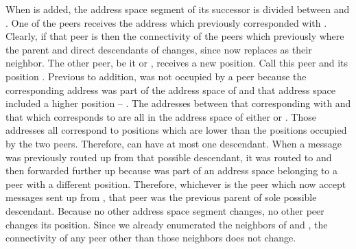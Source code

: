 \documentclass[12pt,english,journal]{elsarticle}
\makeatletter
\numberwithin{equation}{section}
\numberwithin{figure}{section}
\theoremstyle{plain}
\theoremstyle{plain}
\newenvironment{proof}[1][\protect\proofname]{\par
\normalfont\topsep6\p@\@plus6\p@\relax
\trivlist
\itemindent\parindent
\item[\hskip\labelsep
\scshape
#1]\ignorespaces
}{\endtrivlist\@endpefalse
}
\providecommand{\proofname}{Proof}
\makeatother
\begin{document}
\begin{proof}
When  is added, the address space segment of its successor
 is divided between  and . One of the
peers receives the address which previously corresponded with .
Clearly, if that peer is  then the connectivity of the peers
which previously where the parent and direct descendants of 
changes, since  now replaces  as their neighbor.
The other peer, be it  or , receives a new position.
Call this peer  and its position . Previous
to  addition,  was not occupied by a peer because
the corresponding address was part of the address space of 
and that address space included a higher position -- .
The addresses between that corresponding with  and that
which corresponds to  are all in the address space of
either  or . Those addresses all correspond to positions
which are lower than the positions occupied by the two peers. Therefore,
 can have at most one descendant. When a message was previously
routed up from that possible descendant, it was routed to 
and then forwarded further up because  was part of an
address space belonging to a peer with a different position. Therefore,
whichever is the peer which now accept messages sent up from ,
that peer was the previous parent of  sole possible descendant.
Because no other address space segment changes, no other peer changes
its position. Since we already enumerated the neighbors of 
and , the connectivity of any peer other than those neighbors
does not change.\end{proof}
\end{document}
